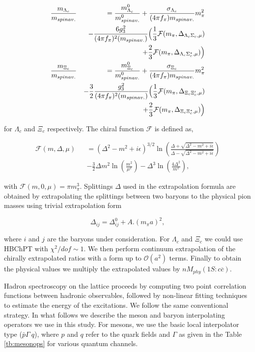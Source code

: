 \documentclass[showkeys,aps,10pt,twocolumn,showpacs,preprintnumbers,amsmath,amssymb,prd,letterpaper,floatfix,nofootinbib,superscriptaddress,]{revtex4-1}
\newcommand\beq{\begin{equation}}
\newcommand\eeq[1]{\label{#1}\end{equation}}
\newcommand\beqa{\begin{eqnarray}}
\newcommand\eeqa[1]{\label{#1}\end{eqnarray}}
\newcommand\nn{\nonumber}
\newcommand\tbn[1]{Table \ref{tb:#1}}
\begin{document}
\beqa
\nn \frac{m_{\Lambda_c}}{m_{spin av.}}&&=\frac{m_{\Lambda_c}^0}{m_{spin av.}^0}+\frac{\sigma_{\Lambda_c}}{(4\pi f_{\pi})m_{spin av.}}m_{\pi}^2 \\
\nn &&- \frac{6g_3^2}{(4\pi f_{\pi})^2(m_{spin av.})}\Bigl(\frac{1}{3}\mathcal{F}(m_{\pi},\Delta_{\Lambda_c\Sigma_c,\mu}) \\
&& \qquad \qquad \qquad +\frac{2}{3}\mathcal{F}(m_{\pi},\Delta_{\Lambda_c\Sigma_c^*,\mu})\Bigr) \label{chextrplnfrm1} \\	
\nn \frac{m_{\Xi_c}}{m_{spin av.}}&&=\frac{m_{\Xi_c}^0}{m_{spin av.}^0}+\frac{\sigma_{\Xi_c}}{(4\pi f_{\pi})m_{spin av.}}m_{\pi}^2 \\
\nn && - \frac{3}{2}\frac{g_3^2}{(4\pi f_{\pi})^2(m_{spin av.})}\Bigl(\frac{1}{3}\mathcal{F}(m_{\pi},\Delta_{\Xi_c\Xi_c^{\prime},\mu}) \\
&& \qquad \qquad \qquad  +\frac{2}{3}\mathcal{F}(m_{\pi},\Delta_{\Xi_c\Xi_c^*,\mu})\Bigr)
\eeqa{chextrplnfrm2}

for $\Lambda_c$ and $\Xi_c$ respectively. The chiral function $\mathcal{F}$ is defined as,

\beqa
\nn \mathcal{F}(m,\Delta, \mu)&&=(\Delta^2-m^2+i\epsilon)^{3/2}\ln\left(\frac{\Delta + \sqrt{\Delta^2-m^2+i\epsilon}}{\Delta -\sqrt{\Delta^2-m^2+i\epsilon}}\right) \\
&& -\frac{3}{2}\Delta m^2\ln\left(\frac{m^2}{\mu^2}\right)-\Delta^3\ln\left(\frac{4\Delta^2}{m^2}\right),
\eeqa{Ffunc}

with $\mathcal{F}(m,0,\mu)=\pi m_{\pi}^3$. Splittings $\Delta$ used in the extrapolation formula 
are obtained by extrapolating the splittings between two baryons to the physical pion masses 
using trivial extrapolation form 

 \beq
 \Delta_{ij}=\Delta_{ij}^0+A.(m_{\pi}a)^2,
 \eeq{Deltaij}

where $i$ and $j$ are the baryons under consideration. For $\Lambda_c$ and $\Xi_c$ we could use 
HBChPT with $\chi^2/dof \sim 1$. We then perform continuum extrapolation of the chirally 
extrapolated ratios with a form up to $\mathcal{O}(a^2)$ terms. Finally to obtain the physical 
values we multiply the extrapolated values by $nM_{phy}(1S:c\overline{c})$. 

Hadron spectroscopy on the lattice proceeds by computing two point correlation functions between 
hadronic observables, followed by non-linear fitting techniques to estimate the energy of the 
excitations. We follow the same conventional strategy. In what follows we describe the meson 
and baryon interpolating operators we use in this study. For mesons, we use the basic local interpolator 
type ($\bar p \Gamma ~q$), where $p$ and $q$ refer to the quark fields and $\Gamma$ 
as given in the \tbn{mesonops} for various quantum channels.
\end{document}
